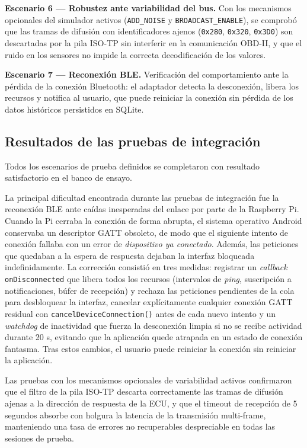 \textbf{Escenario 6 — Robustez ante variabilidad del bus.} Con los mecanismos opcionales del simulador activos (\texttt{ADD\_NOISE} y \texttt{BROADCAST\_ENABLE}), se comprobó que las tramas de difusión con identificadores ajenos (\texttt{0x280}, \texttt{0x320}, \texttt{0x3D0}) son descartadas por la pila ISO-TP sin interferir en la comunicación OBD-II, y que el ruido en los sensores no impide la correcta decodificación de los valores.

\textbf{Escenario 7 — Reconexión BLE.} Verificación del comportamiento ante la pérdida de la conexión Bluetooth: el adaptador detecta la desconexión, libera los recursos y notifica al usuario, que puede reiniciar la conexión sin pérdida de los datos históricos persistidos en SQLite.

\subsection{Resultados de las pruebas de integración}

Todos los escenarios de prueba definidos se completaron con resultado satisfactorio en el banco de ensayo.

La principal dificultad encontrada durante las pruebas de integración fue la reconexión BLE ante caídas inesperadas del enlace por parte de la Raspberry Pi. Cuando la Pi cerraba la conexión de forma abrupta, el sistema operativo Android conservaba un descriptor GATT obsoleto, de modo que el siguiente intento de conexión fallaba con un error de \textit{dispositivo ya conectado}. Además, las peticiones que quedaban a la espera de respuesta dejaban la interfaz bloqueada indefinidamente. La corrección consistió en tres medidas: registrar un \textit{callback} \texttt{onDisconnected} que libera todos los recursos (intervalos de \textit{ping}, suscripción a notificaciones, búfer de recepción) y rechaza las peticiones pendientes de la cola para desbloquear la interfaz, cancelar explícitamente cualquier conexión GATT residual con \texttt{cancelDeviceConnection()} antes de cada nuevo intento y un \textit{watchdog} de inactividad que fuerza la desconexión limpia si no se recibe actividad durante 20 s, evitando que la aplicación quede atrapada en un estado de conexión fantasma. Tras estos cambios, el usuario puede reiniciar la conexión sin reiniciar la aplicación.

Las pruebas con los mecanismos opcionales de variabilidad activos confirmaron que el filtro de la pila ISO-TP descarta correctamente las tramas de difusión ajenas a la dirección de respuesta de la ECU, y que el timeout de recepción de 5 segundos absorbe con holgura la latencia de la transmisión multi-frame, manteniendo una tasa de errores no recuperables despreciable en todas las sesiones de prueba.
